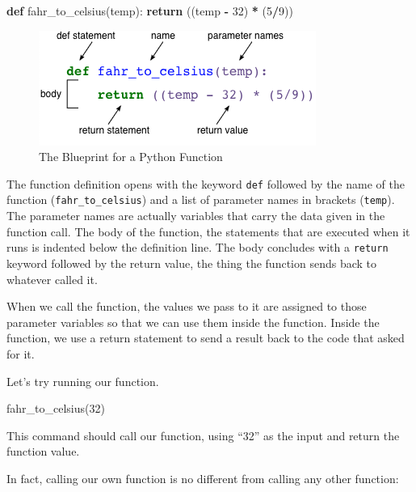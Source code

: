 \documentclass[]{book}
\newenvironment{Shaded}{\begin{snugshade}}{\end{snugshade}}
\newcommand{\ControlFlowTok}[1]{\textcolor[rgb]{0.13,0.29,0.53}{\textbf{#1}}}
\newcommand{\DecValTok}[1]{\textcolor[rgb]{0.00,0.00,0.81}{#1}}
\newcommand{\KeywordTok}[1]{\textcolor[rgb]{0.13,0.29,0.53}{\textbf{#1}}}
\newcommand{\NormalTok}[1]{#1}
\newcommand{\OperatorTok}[1]{\textcolor[rgb]{0.81,0.36,0.00}{\textbf{#1}}}
\theoremstyle{definition}
\theoremstyle{definition}
\theoremstyle{definition}
\theoremstyle{remark}
\begin{document}
\begin{Shaded}
\begin{Highlighting}[]
\KeywordTok{def}\NormalTok{ fahr_to_celsius(temp):}
    \ControlFlowTok{return}\NormalTok{ ((temp }\OperatorTok{-} \DecValTok{32}\NormalTok{) }\OperatorTok{*}\NormalTok{ (}\DecValTok{5}\OperatorTok{/}\DecValTok{9}\NormalTok{))}
\end{Highlighting}
\end{Shaded}

\begin{figure}
\centering
\includegraphics{assets/python-function.png}
\caption{The Blueprint for a Python Function}
\end{figure}

The function definition opens with the keyword \texttt{def} followed by
the name of the function (\texttt{fahr\_to\_celsius}) and a list of
parameter names in brackets (\texttt{temp}). The parameter names are
actually variables that carry the data given in the function call. The
body of the function, the statements that are executed when it runs is
indented below the definition line. The body concludes with a
\texttt{return} keyword followed by the return value, the thing the
function sends back to whatever called it.

When we call the function, the values we pass to it are assigned to
those parameter variables so that we can use them inside the function.
Inside the function, we use a return statement to send a result back to
the code that asked for it.

Let's try running our function.

\begin{Shaded}
\begin{Highlighting}[]
\NormalTok{fahr_to_celsius(}\DecValTok{32}\NormalTok{)}
\end{Highlighting}
\end{Shaded}

This command should call our function, using ``32'' as the input and
return the function value.

In fact, calling our own function is no different from calling any other
function:
\end{document}
